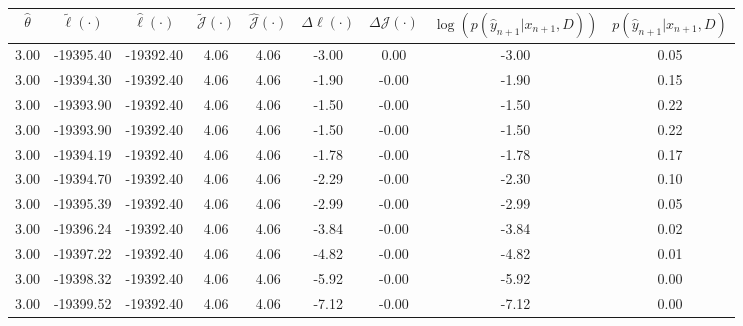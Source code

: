 \begin{table}[htbp]
        \centering
        \tiny
        \begin{adjustbox}{angle=90}
            \begin{tabular}{|c|c|c|c|c|c|c|c|c|}
                \hline
                 $\hat{\theta}$ & $\tilde{\ell}(\cdot)$ & $\hat{\ell}(\cdot)$ & $\tilde{\mathcal{J}}(\cdot)$ & $\hat{\mathcal{J}}(\cdot)$ & $\Delta \ell(\cdot)$ & $\Delta \mathcal{J}(\cdot)$ & $\log(p(\hat{y}_{n+1}|x_{n+1}, D))$ & $p(\hat{y}_{n+1}|x_{n+1}, D)$ \\
                \hline
                 3.00 & -19395.40 & -19392.40 & 4.06 & 4.06 & -3.00 & 0.00 & -3.00 & 0.05\\ \hline
 3.00 & -19394.30 & -19392.40 & 4.06 & 4.06 & -1.90 & -0.00 & -1.90 & 0.15\\ \hline
 3.00 & -19393.90 & -19392.40 & 4.06 & 4.06 & -1.50 & -0.00 & -1.50 & 0.22\\ \hline
 3.00 & -19393.90 & -19392.40 & 4.06 & 4.06 & -1.50 & -0.00 & -1.50 & 0.22\\ \hline
 3.00 & -19394.19 & -19392.40 & 4.06 & 4.06 & -1.78 & -0.00 & -1.78 & 0.17\\ \hline
 3.00 & -19394.70 & -19392.40 & 4.06 & 4.06 & -2.29 & -0.00 & -2.30 & 0.10\\ \hline
 3.00 & -19395.39 & -19392.40 & 4.06 & 4.06 & -2.99 & -0.00 & -2.99 & 0.05\\ \hline
 3.00 & -19396.24 & -19392.40 & 4.06 & 4.06 & -3.84 & -0.00 & -3.84 & 0.02\\ \hline
 3.00 & -19397.22 & -19392.40 & 4.06 & 4.06 & -4.82 & -0.00 & -4.82 & 0.01\\ \hline
 3.00 & -19398.32 & -19392.40 & 4.06 & 4.06 & -5.92 & -0.00 & -5.92 & 0.00\\ \hline
 3.00 & -19399.52 & -19392.40 & 4.06 & 4.06 & -7.12 & -0.00 & -7.12 & 0.00\\ \hline
            \end{tabular}
        \end{adjustbox}
        \caption{}
        \label{}
    \end{table}
    